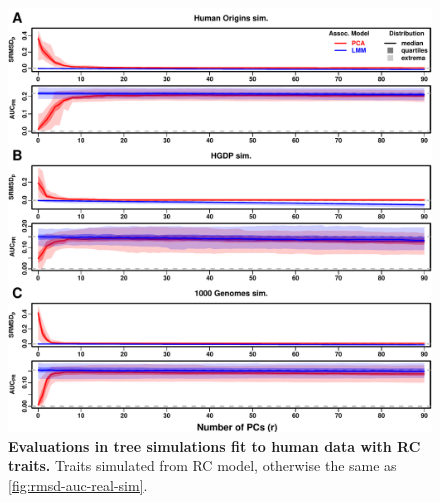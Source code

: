 \documentclass[11pt]{article}
\begin{document}
\begin{figure}[hp!]
  \centering
  \includegraphics[width=\textwidth,height=\textheight,keepaspectratio]{rmsd-auc-real-sim.pdf}
  \caption{
    {\bf Evaluations in tree simulations fit to human data with RC traits.}
    Traits simulated from RC model, otherwise the same as \cref{fig:rmsd-auc-real-sim}.
  }
  \label{fig:rmsd-auc-real-sim-rc}
\end{figure}
\end{document}
